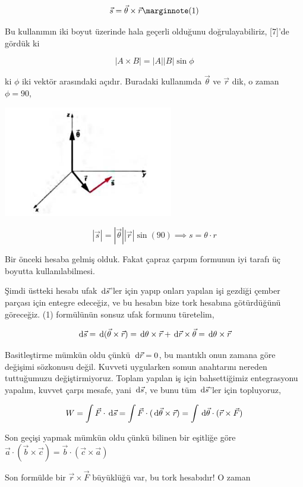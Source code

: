 \documentclass[12pt,fleqn]{article}\usepackage{../../common}
\begin{document}
$$
\vec{s} = \vec{\theta} \times \vec{r}
\mlabel{1}
$$

Bu kullanımın iki boyut üzerinde hala geçerli olduğunu doğrulayabiliriz, [7]'de
gördük ki

$$
|A \times B| = |A||B|\sin\phi
$$

ki $\phi$ iki vektör arasındaki açıdır. Buradaki kullanımda $\vec{\theta}$ ve
$\vec{r}$ dik, o zaman $\phi=90$,

\includegraphics[width=20em]{phy_005_basics_02_05.jpg}

$$
|\vec{s}| = |\vec{\theta}| |\vec{r}| \sin(90) \implies s = \theta \cdot r
$$

Bir önceki hesaba gelmiş olduk. Fakat çapraz çarpım formunun iyi tarafı
üç boyutta kullanılabilmesi. 

Şimdi üstteki hesabı ufak $\,\mathrm{d} \vec{s}$'ler için yapıp onları yapılan işi
gezdiği çember parçası için entegre edeceğiz, ve bu hesabın bize tork hesabına
götürdüğünü göreceğiz. (1) formülünün sonsuz ufak formunu türetelim,

$$
\,\mathrm{d} \vec{s} =
\,\mathrm{d} (\vec{\theta} \times \vec{r} ) =
\,\mathrm{d} \theta \times \vec{r} + \,\mathrm{d} \vec{r} \times \vec{\theta} =
\,\mathrm{d} \theta \times \vec{r}
$$

Basitleştirme mümkün oldu çünkü $\,\mathrm{d} \vec{r} = 0$, bu mantıklı onun zamana göre
değişimi sözkonusu değil. Kuvveti uygularken somun anahtarını nereden
tuttuğumuzu değiştirmiyoruz. Toplam yapılan iş için bahsettiğimiz entegrasyonu
yapalım, kuvvet çarpı mesafe, yani $\,\mathrm{d} \vec{s}$, ve bunu tüm $\,\mathrm{d} \vec{s}$'ler
için topluyoruz,

$$
W = \int \vec{F} \cdot \,\mathrm{d} \vec{s} =
\int \vec{F} \cdot (\,\mathrm{d} \vec{\theta} \times \vec{r}) =
\int \,\mathrm{d} \vec{\theta} \cdot (\vec{r}  \times \vec{F}) 
$$

Son geçişi yapmak mümkün oldu çünkü bilinen bir eşitliğe göre
$\vec{a} \cdot (\vec{b} \times \vec{c}) = \vec{b} \cdot (\vec{c} \times \vec{a})$

Son formülde bir $\vec{r}  \times \vec{F}$ büyüklüğü var, bu tork hesabıdır! O
zaman
\end{document}
